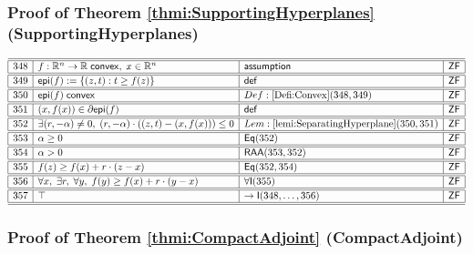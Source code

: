 \documentclass[11pt,reqno]{amsart}
\begin{document}
\medskip

\subsubsection*{Proof of Theorem \ref{thmi:SupportingHyperplanes} (\textsf{SupportingHyperplanes})}

\noindent$%
\begin{array}{|r|l|l|l|}
\hline\hline
348 & f:\mathbb{R}^{n}\to\mathbb{R}\;\mathsf{convex},\;x\in\mathbb{R}^{n} & \mathsf{assumption} & \mathsf{ZF} \\ \hline\hline
349 & \mathsf{epi}(f):=\{(z,t):t\ge f(z)\} & \mathsf{def} & \mathsf{ZF} \\ \hline\hline
350 & \mathsf{epi}(f)\;\mathsf{convex} & Def:\ref{Defi:Convex}(348,349) & \mathsf{ZF} \\ \hline\hline
351 & (x,f(x))\in\partial\mathsf{epi}(f) & \mathsf{def} & \mathsf{ZF} \\ \hline\hline
352 & \exists(r,-\alpha)\neq0,\;(r,-\alpha)\cdot((z,t)-(x,f(x)))\le0 & Lem:\ref{lemi:SeparatingHyperplane}(350,351) & \mathsf{ZF} \\ \hline\hline
353 & \alpha\ge0 & \mathsf{Eq}(352) & \mathsf{ZF} \\ \hline\hline
354 & \alpha>0 & \mathsf{RAA}(353,352) & \mathsf{ZF} \\ \hline\hline
355 & f(z)\ge f(x)+r\cdot(z-x) & \mathsf{Eq}(352,354) & \mathsf{ZF} \\ \hline\hline
356 & \forall x,\;\exists r,\;\forall y,\;f(y)\ge f(x)+r\cdot(y-x) & \forall\mathsf{I}(355) & \mathsf{ZF} \\ \hline\hline
357 & \top & \to\mathsf{I}(348,\dots,356) & \mathsf{ZF} \\ \hline\hline
\end{array}%
$

\medskip

\subsubsection*{Proof of Theorem \ref{thmi:CompactAdjoint} (\textsf{CompactAdjoint})}
\end{document}
